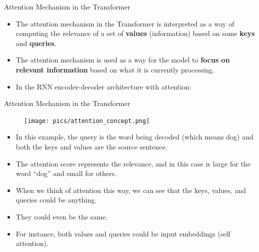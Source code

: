 \documentclass[handout]{beamer}
\begin{document}
\begin{frame}{Attention Mechanism in the Transformer}
\begin{scriptsize}
\begin{itemize}
 \item The attention mechanism in the Transformer is interpreted as a way of computing the relevance of a set of \textbf{values} (information) based on some \textbf{keys} and \textbf{queries}. 
 
 \item The attention mechanism is used as a way for the model to \textbf{focus on relevant information} based on what it is currently processing.
 
 \item In the RNN encoder-decoder architecture with attention:
 

 \begin{enumerate}

 \end{enumerate}

 
\end{itemize}



\end{scriptsize}

\end{frame}



\begin{frame}{Attention Mechanism in the Transformer}

    \begin{figure}[h]
        	\texttt{[image: pics/attention\_concept.png]}
        \end{figure}  

\begin{scriptsize}
\begin{itemize}        
\item In this example, the query is the word being decoded (which means dog) and both the keys and values are the source sentence. 
\item The attention score represents the relevance, and in this case is large for the word “dog” and small for others.
 \item When we think of attention this way, we can see that the keys, values, and queries could be anything. 
 \item They could even be the same. 
 \item For instance, both values and queries could be input embeddings (self attention). 
\end{itemize}

\end{scriptsize}

\end{frame}
\end{document}

